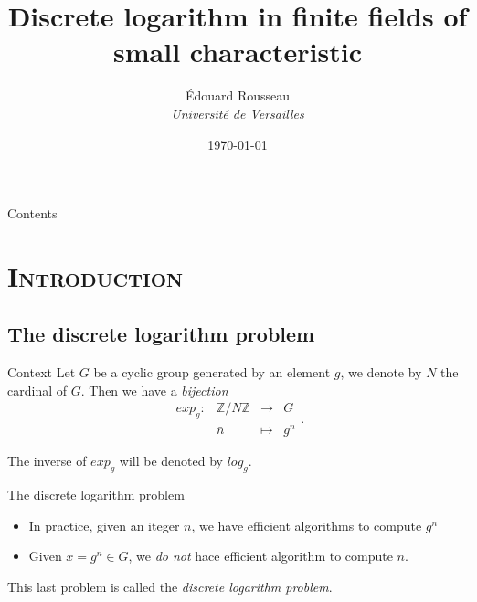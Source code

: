 \documentclass[xcolor=x11names,compress]{beamer}
\theoremstyle{break}
\theoremstyle{sc}
\theoremstyle{definition}
\theoremstyle{remark}
\begin{document}
\begin{frame}
  \title{Discrete logarithm in finite fields of small characteristic}
\author{
Édouard Rousseau\\
{\it Université de Versailles\\}
}
\date{\today}
\titlepage
\end{frame}

\begin{frame}{Contents}
\tableofcontents
\end{frame}

\section{\scshape Introduction}
\subsection{The discrete logarithm problem}
\begin{frame}{Context}
  Let $G$ be a cyclic group generated by an element $g$, we denote by $N$ the
  cardinal of $G$. Then we have a \emph{bijection}
  \[
    \begin{array}{cccc}
      exp_g: & \mathbb{Z}/N\mathbb{Z} & \to & G \\
      & \bar n & \mapsto & g^n
    \end{array}.
  \]

  The inverse of $exp_g$ will be denoted by $log_g$. 
\end{frame}

\begin{frame}{The discrete logarithm problem}
  \begin{itemize}
    \item In practice, given an iteger $n$, we have efficient algorithms
      to compute $g^n$
    \item Given $x = g^n \in G$, we \emph{do not} hace efficient algorithm
      to compute $n$.
  \end{itemize}
  This last problem is called the \emph{discrete logarithm problem}.
\end{frame}
\end{document}
